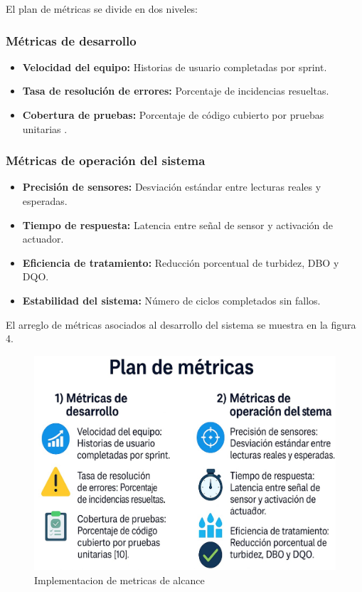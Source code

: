 \documentclass[conference]{IEEEtran}
\begin{document}
	El plan de métricas se divide en dos niveles:
	
	\subsubsection{Métricas de desarrollo}
	
	\begin{itemize}
		\item \textbf{Velocidad del equipo:} Historias de usuario completadas por sprint.
		\item \textbf{Tasa de resolución de errores:} Porcentaje de incidencias resueltas.
		\item \textbf{Cobertura de pruebas:} Porcentaje de código cubierto por pruebas unitarias \cite{b10}.
	\end{itemize}
	
	\subsubsection{Métricas de operación del sistema}
	
	\begin{itemize}
		\item \textbf{Precisión de sensores:} Desviación estándar entre lecturas reales y esperadas.
		\item \textbf{Tiempo de respuesta:} Latencia entre señal de sensor y activación de actuador.
		\item \textbf{Eficiencia de tratamiento:} Reducción porcentual de turbidez, DBO y DQO.
		\item \textbf{Estabilidad del sistema:} Número de ciclos completados sin fallos.
	\end{itemize}
	
	El arreglo de métricas asociados al desarrollo del sistema se muestra en la figura 4.
	
	\begin{figure}[htbp]
		\centering
		\includegraphics[width=\columnwidth]{fig4.jpg}
		\caption{Implementacion de metricas de alcance}
		\label{fig:esquema-sistema}
	\end{figure}
	
\end{document}
